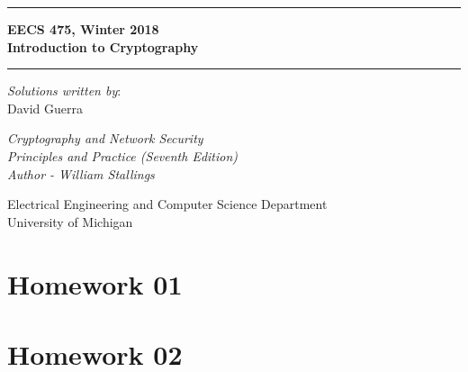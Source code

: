 \documentclass[answers]{exam}  %
\begin{document}
	\begin{titlepage}
		\begin{center}
			\vspace*{4cm}

			\hrule
			\vspace{0.5cm}
			{ 
				\LARGE 
				\textbf{EECS 475, Winter 2018}\\
				\textbf{Introduction to Cryptography}
			}
			\vspace{0.5cm}
			\hrule

			\vspace{2cm}

			\textit{Solutions written by}:\\
			{\large David Guerra}

			\vfill

			{ \Large \textit{Cryptography and Network Security}\\ }
			{ \Large \textit{Principles and Practice (Seventh Edition)}\\ }
			{ \Large \textit{Author - William Stallings} }

			\vspace{2cm}

			\Large
			Electrical Engineering and Computer Science Department\\
			University of Michigan

		\end{center}
	\end{titlepage}
	\newpage

	\tableofcontents
	\newpage

	\section{Homework 01}
	
	\newpage

	\section{Homework 02}
	
	\newpage





\end{document}
